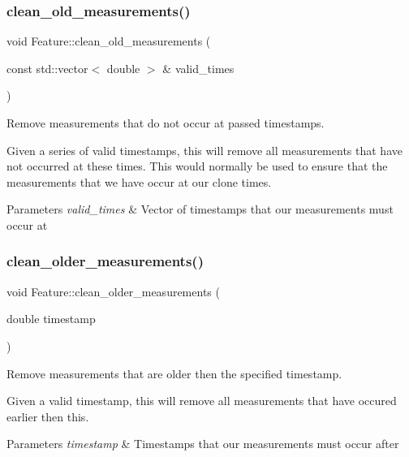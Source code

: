 \subsubsection{\texorpdfstring{clean\+\_\+old\+\_\+measurements()}{clean\_old\_measurements()}}
{\footnotesize\ttfamily void Feature\+::clean\+\_\+old\+\_\+measurements (\begin{DoxyParamCaption}\item[{const std\+::vector$<$ double $>$ \&}]{valid\+\_\+times }\end{DoxyParamCaption})}



Remove measurements that do not occur at passed timestamps. 

Given a series of valid timestamps, this will remove all measurements that have not occurred at these times. This would normally be used to ensure that the measurements that we have occur at our clone times.


\begin{DoxyParams}{Parameters}
{\em valid\+\_\+times} & Vector of timestamps that our measurements must occur at \\
\hline
\end{DoxyParams}
\mbox{\label{classov__core_1_1Feature_ad5426e15b7fb0f1f315c12465c63787d}} 
\subsubsection{\texorpdfstring{clean\+\_\+older\+\_\+measurements()}{clean\_older\_measurements()}}
{\footnotesize\ttfamily void Feature\+::clean\+\_\+older\+\_\+measurements (\begin{DoxyParamCaption}\item[{double}]{timestamp }\end{DoxyParamCaption})}



Remove measurements that are older then the specified timestamp. 

Given a valid timestamp, this will remove all measurements that have occured earlier then this.


\begin{DoxyParams}{Parameters}
{\em timestamp} & Timestamps that our measurements must occur after \\
\hline
\end{DoxyParams}
